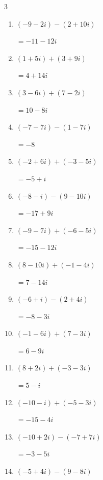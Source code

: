 \begin{multicols}{3}
\begin{enumerate}
        $\displaystyle =4-12i$

  \item $\displaystyle (-9-2i) - (2+10i)$

        $\displaystyle =-11-12i$

  \item $\displaystyle (1+5i) + (3+9i)$

        $\displaystyle =4+14i$

  \item $\displaystyle (3-6i) + (7-2i)$

        $\displaystyle =10-8i$

  \item $\displaystyle (-7-7i) - (1-7i)$

        $\displaystyle =-8$

  \item $\displaystyle (-2+6i) + (-3-5i)$

        $\displaystyle =-5+i$

  \item $\displaystyle (-8-i) - (9-10i)$

        $\displaystyle =-17+9i$

  \item $\displaystyle (-9-7i) + (-6-5i)$

        $\displaystyle =-15-12i$

  \item $\displaystyle (8-10i) + (-1-4i)$

        $\displaystyle =7-14i$

  \item $\displaystyle (-6+i) - (2+4i)$

        $\displaystyle =-8-3i$

  \item $\displaystyle (-1-6i) + (7-3i)$

        $\displaystyle =6-9i$

  \item $\displaystyle (8+2i) + (-3-3i)$

        $\displaystyle =5-i$

  \item $\displaystyle (-10-i) + (-5-3i)$

        $\displaystyle =-15-4i$

  \item $\displaystyle (-10+2i) - (-7+7i)$

        $\displaystyle =-3-5i$

  \item $\displaystyle (-5+4i) - (9-8i)$


\end{enumerate}
\end{multicols}
